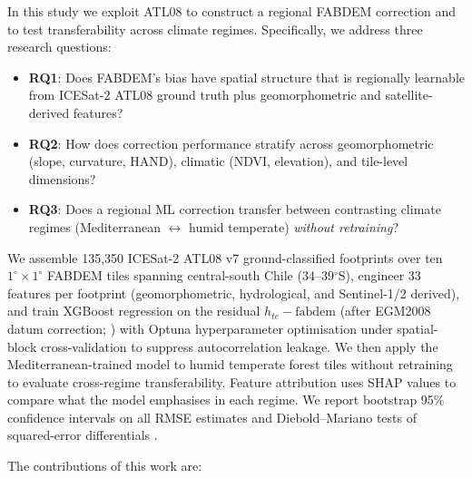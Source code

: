 \documentclass[preprint,authoryear,number]{elsarticle}
\begin{document}
In this study we exploit ATL08 to construct a regional FABDEM correction and to test transferability across climate regimes. Specifically, we address three research questions:

\begin{itemize}
\item \textbf{RQ1}: Does FABDEM's bias have spatial structure that is regionally learnable from ICESat-2 ATL08 ground truth plus geomorphometric and satellite-derived features?
\item \textbf{RQ2}: How does correction performance stratify across geomorphometric (slope, curvature, HAND), climatic (NDVI, elevation), and tile-level dimensions?
\item \textbf{RQ3}: Does a regional ML correction transfer between contrasting climate regimes (Mediterranean $\leftrightarrow$ humid temperate) \emph{without retraining}?
\end{itemize}

We assemble 135{,}350 ICESat-2 ATL08 v7 ground-classified footprints over ten $1^{\circ} \times 1^{\circ}$ FABDEM tiles spanning central-south Chile (34--39$^{\circ}$S), engineer 33 features per footprint (geomorphometric, hydrological, and Sentinel-1/2 derived), and train XGBoost regression \citep{Chen2016XGBoost} on the residual $h_{te} - \mathrm{fabdem}$ (after EGM2008 datum correction; \citealt{Pavlis2012EGM2008}) with Optuna hyperparameter optimisation \citep{Akiba2019Optuna} under spatial-block cross-validation \citep{Roberts2017SpatialCV} to suppress autocorrelation leakage. We then apply the Mediterranean-trained model to humid temperate forest tiles without retraining to evaluate cross-regime transferability. Feature attribution uses SHAP values \citep{Lundberg2017SHAP} to compare what the model emphasises in each regime. We report bootstrap 95\% confidence intervals on all RMSE estimates and Diebold--Mariano tests of squared-error differentials \citep{Diebold1995ComparingPredictiveAccuracy}.

The contributions of this work are:
\end{document}
